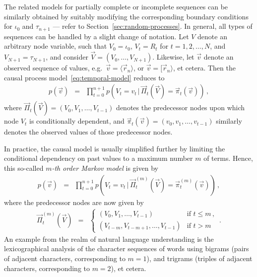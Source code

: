 \documentclass[a4paper]{article}
\begin{document}
The related models for partially complete or incomplete sequences can be similarly obtained
by suitably modifying the corresponding boundary conditions for $\iota_0$ and $\tau_{n+1}$
--- refer to Section~\ref{sec:random-processes}.
In general, all types of sequences can be handled by a slight change of notation.
Let $V$ denote an arbitrary node variable, such that $V_0=\iota_0$, $V_t=R_t$ for $t=1,2,\ldots,N$,
and $V_{N+1}=\tau_{N+1}$, and consider $\vec{V}=(V_0,\ldots,V_{N+1})$. 
Likewise, let $\vec{v}$ denote an observed sequence of values, e.g.\ $\vec{v}=\langle\vec{r}_n\rangle$, or
$\vec{v}=[\vec{r}_n\rangle$, et cetera. Then the causal process model~\eqref{eq:temporal-model} reduces to
\begin{eqnarray}
p(\vec{v}) & = & \prod_{t=0}^{n+1}p(V_t=v_t\,|\,\vec{\Pi}_t(\vec{V})=\vec{\pi}_t(\vec{v}))\,,
\end{eqnarray}
where $\vec{\Pi}_t(\vec{V})=(V_0,V_1,\ldots,V_{t-1})$ denotes the predecessor nodes upon which node $V_t$
is conditionally dependent, and 
$\vec{\pi}_t(\vec{v})=(v_0,v_1,\ldots,v_{t-1})$ similarly denotes the observed values of those predecessor nodes. 

In practice, the causal model is usually simplified further by limiting the 
conditional dependency on past values to a maximum number $m$ of terms.
Hence, this so-called {\em $m$-th order Markov model} is given by
\begin{eqnarray}
p(\vec{v}) & = & \prod_{t=0}^{n+1}p(V_t=v_t\,|\,\vec{\Pi}^{(m)}_t(\vec{V})=\vec{\pi}_t^{(m)}(\vec{v}))\,,
\end{eqnarray}
where the predecessor nodes are now given by
\begin{eqnarray}
\vec{\Pi}_t^{(m)}(\vec{V}) & = & 
\left\{
\begin{array}{ll}
(V_0,V_1,\ldots,V_{t-1}) & \mbox{if }t\le m\,,
\\
(V_{t-m},V_{t-m+1},\ldots,V_{t-1}) & \mbox{if }t>m
\end{array}
\right.\,.
\end{eqnarray}
An example from the realm of natural language understanding is the lexicographical analysis of the character
sequences of words using bigrams (pairs of adjacent characters, corresponding to $m=1$), and trigrams 
(triples of adjacent characters, corresponding to $m=2$), et cetera.
\end{document}
